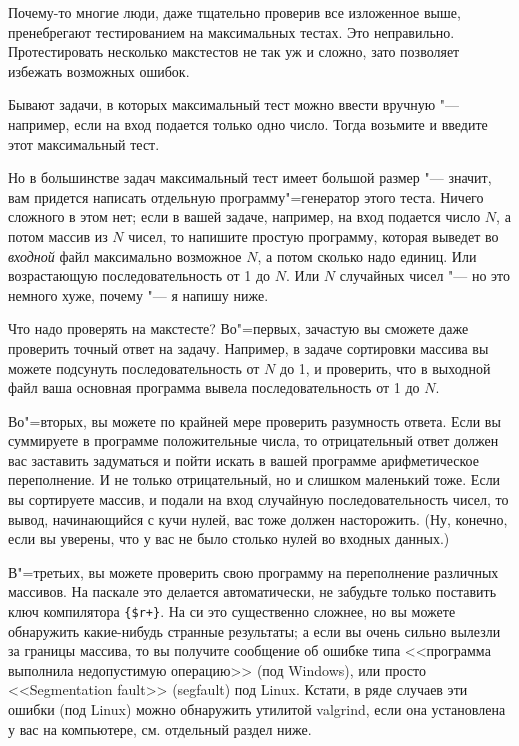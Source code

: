 \documentclass[a4paper,10pt]{problems}
\begin{document}
Почему-то многие люди, даже тщательно проверив все изложенное выше, пренебрегают тестированием на максимальных тестах.
Это неправильно. Протестировать несколько макстестов не так уж и сложно, зато позволяет избежать возможных ошибок.

Бывают задачи, в которых максимальный тест можно ввести вручную "--- например, если на вход подается только одно число.
Тогда возьмите и введите этот максимальный тест.

Но в большинстве задач максимальный тест имеет большой размер "--- значит, вам придется написать отдельную программу"=генератор этого теста. 
Ничего сложного в этом нет; если в вашей задаче, например, на вход подается число $N$, а потом массив из $N$ чисел, то напишите простую программу,
которая выведет во \textit{входной} файл максимально возможное $N$, а потом сколько надо единиц. 
Или возрастающую последовательность от 1 до $N$. 
Или $N$ случайных чисел "--- но это немного хуже, почему "--- я напишу ниже.

Что надо проверять на макстесте? 
Во"=первых, зачастую вы сможете даже проверить точный ответ на задачу. 
Например, в задаче сортировки массива вы можете подсунуть последовательность от $N$ до 1, и проверить, что в выходной файл ваша основная программа
вывела последовательность от 1 до $N$.

Во"=вторых, вы можете по крайней мере проверить разумность ответа. 
Если вы суммируете в программе положительные числа, то отрицательный ответ должен вас заставить задуматься и пойти искать в вашей программе арифметическое переполнение. И не только отрицательный, но и слишком маленький тоже. Если вы сортируете массив, и подали на вход случайную последовательность чисел, то вывод, начинающийся с кучи нулей, вас тоже должен насторожить. (Ну, конечно, если вы уверены, что у вас не было столько нулей во входных данных.)

В"=третьих, вы можете проверить свою программу на переполнение различных массивов. 
На паскале это делается автоматически, не забудьте только поставить ключ компилятора \verb`{$r+}`.
На си это существенно сложнее, но вы можете обнаружить какие-нибудь странные результаты;
а если вы очень сильно вылезли за границы массива, то вы получите сообщение об ошибке типа <<программа выполнила недопустимую операцию>> (под Windows),
или просто <<Segmentation fault>> (segfault) под Linux. 
Кстати, в ряде случаев эти ошибки (под Linux) можно обнаружить утилитой valgrind, если она установлена у вас на компьютере, см. отдельный раздел ниже.
\end{document}
